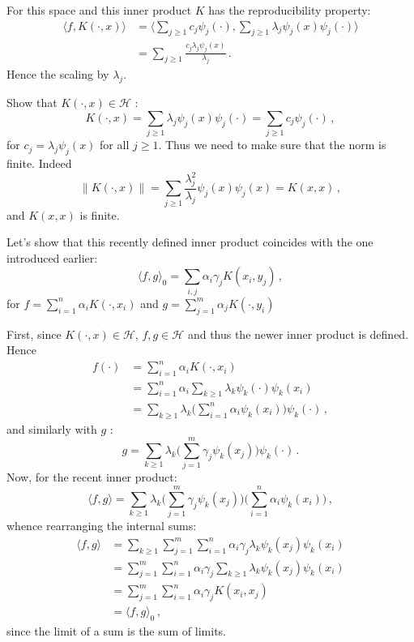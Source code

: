 \documentclass[a4paper]{article}
\newcommand{\Hcal}{\mathcal{H}}
\begin{document}
For this space and this inner product $K$ has the reproducibility property:
\begin{align*}
	\langle f, K(\cdot,x)\rangle
	&= \bigl\langle \sum_{j\geq1}c_j \psi_j(\cdot), \sum_{j\geq1} \lambda_j \psi_j(x) \psi_j(\cdot) \bigr\rangle\\
	&= \sum_{j\geq1} \frac{c_j \lambda_j \psi_j(x) }{\lambda_j}\,.
\end{align*}
Hence the scaling by $\lambda_j$.

Show that $K(\cdot, x)\in \Hcal$ :
\[
K(\cdot, x)
= \sum_{j\geq1} \lambda_j \psi_j(x) \psi_j(\cdot)
= \sum_{j\geq1} c_j \psi_j(\cdot)\,,
\]
for $c_j = \lambda_j \psi_j(x)$ for all $j\geq1$. Thus we need to make sure that the norm is finite.
Indeed
\[ \|K(\cdot,x)\| = \sum_{j\geq1} \frac{\lambda_j^2}{\lambda_j} \psi_j(x) \psi_j(x) = K(x,x) \,, \]
and $K(x,x)$ is finite.

Let's show that this recently defined inner product coincides with the one introduced earlier:
\[
\langle f,g\rangle_0 = \sum_{i,j} \alpha_i \gamma_j K(x_i, y_j) \,,
\]
for $f = \sum_{i=1}^n \alpha_i K(\cdot, x_i)$ and $g = \sum_{j=1}^m \alpha_j K(\cdot, y_i)$

First, since $K(\cdot, x)\in \Hcal$, $f,g\in \Hcal$ and thus the newer inner product is defined.
Hence
\begin{align*}
	f(\cdot) &= \sum_{i=1}^n \alpha_i K(\cdot, x_i)\\
	&= \sum_{i=1}^n \alpha_i \sum_{k\geq1} \lambda_k \psi_k(\cdot) \psi_k(x_i)\\
	&= \sum_{k\geq1} \lambda_k \bigl(\sum_{i=1}^n \alpha_i \psi_k(x_i)\bigr) \psi_k(\cdot)\,,
\end{align*}
and similarly with $g$ :
\[
g = \sum_{k\geq1} \lambda_k \bigl(\sum_{j=1}^m \gamma_j \psi_k(x_j)\bigr) \psi_k(\cdot)\,.
\]
Now, for the recent inner product:
\[
\langle f,g\rangle
= \sum_{k\geq1} \lambda_k \bigl(\sum_{j=1}^m \gamma_j \psi_k(x_j)\bigr) \bigl(\sum_{i=1}^n \alpha_i \psi_k(x_i)\bigr)\,,
\]
whence rearranging the internal sums:
\begin{align*}
	\langle f,g\rangle
	&= \sum_{k\geq1} \sum_{j=1}^m \sum_{i=1}^n \alpha_i \gamma_j \lambda_k \psi_k(x_j) \psi_k(x_i) \\
	&= \sum_{j=1}^m \sum_{i=1}^n \alpha_i \gamma_j \sum_{k\geq1} \lambda_k \psi_k(x_j) \psi_k(x_i) \\
	&= \sum_{j=1}^m \sum_{i=1}^n \alpha_i \gamma_j K(x_i,x_j) \\
	&= \langle f,g\rangle_0 \,,
\end{align*}
since the limit of a sum is the sum of limits.
\end{document}
